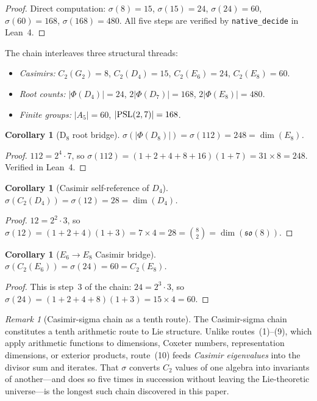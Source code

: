 \documentclass[11pt]{amsart}
\theoremstyle{plain}
\newtheorem{corollary}[theorem]{Corollary}
\theoremstyle{definition}
\theoremstyle{remark}
\newtheorem{remark}[theorem]{Remark}
\renewcommand{\Phi}{\varPhi}
\begin{document}
\begin{proof}
Direct computation: $\sigma(8) = 15$, $\sigma(15) = 24$, $\sigma(24) = 60$,
$\sigma(60) = 168$, $\sigma(168) = 480$.  All five steps are verified by
\texttt{native\_decide} in Lean~4.
\end{proof}

The chain interleaves three structural threads:
\begin{itemize}
  \item \emph{Casimirs:} $C_2(G_2) = 8$,\; $C_2(D_4) = 15$,\;
    $C_2(E_6) = 24$,\; $C_2(E_8) = 60$.
  \item \emph{Root counts:} $|\Phi(D_4)| = 24$,\; $2|\Phi(D_7)| = 168$,\;
    $2|\Phi(E_8)| = 480$.
  \item \emph{Finite groups:} $|A_5| = 60$,\; $|{\rm PSL}(2,7)| = 168$.
\end{itemize}

\begin{corollary}[D$_8$ root bridge]\label{cor:D8-root-bridge}
$\sigma(|\Phi(D_8)|) = \sigma(112) = 248 = \dim(E_8)$.
\end{corollary}

\begin{proof}
$112 = 2^4 \cdot 7$, so $\sigma(112) = (1{+}2{+}4{+}8{+}16)(1{+}7)
= 31 \times 8 = 248$.  Verified in Lean~4.
\end{proof}

\begin{corollary}[Casimir self-reference of $D_4$]\label{cor:casimir-self-ref}
$\sigma(C_2(D_4)) = \sigma(12) = 28 = \dim(D_4)$.
\end{corollary}

\begin{proof}
$12 = 2^2 \cdot 3$, so $\sigma(12) = (1{+}2{+}4)(1{+}3) = 7 \times 4 = 28
= \binom{8}{2} = \dim(\mathfrak{so}(8))$.
\end{proof}

\begin{corollary}[$E_6 \to E_8$ Casimir bridge]\label{cor:E6-E8-bridge}
$\sigma(C_2(E_6)) = \sigma(24) = 60 = C_2(E_8)$.
\end{corollary}

\begin{proof}
This is step~3 of the chain: $24 = 2^3 \cdot 3$, so
$\sigma(24) = (1{+}2{+}4{+}8)(1{+}3) = 15 \times 4 = 60$.
\end{proof}

\begin{remark}[Casimir-sigma chain as a tenth route]\label{rem:tenth-route}
The Casimir-sigma chain constitutes a tenth arithmetic route to Lie
structure.  Unlike routes~(1)--(9), which apply arithmetic functions to
dimensions, Coxeter numbers, representation dimensions, or exterior
products, route~(10) feeds \emph{Casimir eigenvalues} into the
divisor sum and iterates.  That $\sigma$ converts $C_2$ values of one
algebra into invariants of another---and does so five times in
succession without leaving the Lie-theoretic universe---is the longest
such chain discovered in this paper.
\end{remark}
\end{document}
